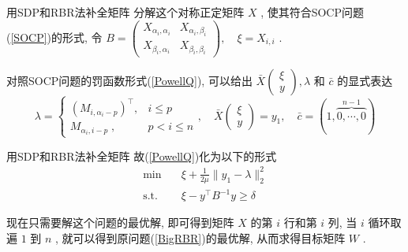 \documentclass[slidestop,compress,mathserif,UTF8]{beamer}
\numberwithin{equation}{section}
\begin{document}
            \begin{frame}[t]{用SDP和RBR法补全矩阵}
                分解这个对称正定矩阵 $X$ , 使其符合SOCP问题(\ref{SOCP})的形式, 令
                $
                        B 
                    =	\begin{pmatrix}
                            X_{\alpha_i, \alpha_i} & X_{\alpha_i, \beta_i} \\
                            X_{\beta_i, \alpha_i} & X_{\beta_i, \beta_i}
                        \end{pmatrix} ,\quad 
                        \xi
                    =	X_{i, i}
                $ .
                
                对照SOCP问题的罚函数形式(\ref{PowellQ}), 可以给出 $\bar{X} \begin{pmatrix}\xi \\ y\end{pmatrix}, \lambda$ 和 $\bar{c}$ 的显式表达
                \begin{equation}\label{BigRBRCondition2}
                        \lambda
                    = 	\begin{cases}
                            (M_{i,\alpha_i-p})^\top,&i\leq p\\
                            M_{\alpha_i,i-p}\;,&p<i\leq n
                        \end{cases}
                        , \quad
                        \bar{X} \begin{pmatrix} \xi \\ y \end{pmatrix}
                    =	y_1
                        , \quad
                        \bar{c}
                    =	(1, \overbrace{0, \cdots, 0}^{n - 1})
                \end{equation}
            \end{frame}
            \begin{frame}[t]{用SDP和RBR法补全矩阵}
                故(\ref{PowellQ})化为以下的形式
                \begin{equation}
                    \begin{split}\label{TrueRBRQ}
                        \min \quad
                            & \xi + \frac{1}{2\mu} \lVert{y_1 - \lambda}\rVert^2_2\\
                        \text{s.t.} \quad
                            & \xi - y^\top B^{-1} y \geq \delta
                    \end{split}
                \end{equation}

                现在只需要解这个问题的最优解, 即可得到矩阵 $X$ 的第 $i$ 行和第 $i$ 列, 当 $i$ 循环取遍 $1$ 到 $n$ , 就可以得到原问题(\ref{BigRBR})的最优解, 从而求得目标矩阵 $W$ .
            \end{frame}
\end{document}
